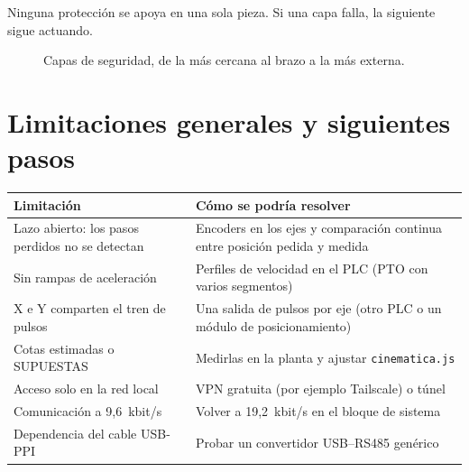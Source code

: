 \documentclass[a4paper,11pt]{article}
\newcommand{\codigo}[1]{\texttt{#1}}
\begin{document}
Ninguna protección se apoya en una sola pieza. Si una capa falla, la siguiente sigue actuando.

\begin{figure}[H]
\centering
{}
\caption{Capas de seguridad, de la más cercana al brazo a la más externa.}
\end{figure}

\section{Limitaciones generales y siguientes pasos}

\begin{center}\small
\begin{tabularx}{\linewidth}{>{\raggedright}p{5.2cm} >{\raggedright\arraybackslash}X}
\toprule
\textbf{Limitación} & \textbf{Cómo se podría resolver}\\
\midrule
Lazo abierto: los pasos perdidos no se detectan & Encoders en los ejes y comparación continua entre posición pedida y medida\\
Sin rampas de aceleración & Perfiles de velocidad en el PLC (PTO con varios segmentos)\\
X e Y comparten el tren de pulsos & Una salida de pulsos por eje (otro PLC o un módulo de posicionamiento)\\
Cotas estimadas o SUPUESTAS & Medirlas en la planta y ajustar \codigo{cinematica.js}\\
Acceso solo en la red local & VPN gratuita (por ejemplo Tailscale) o túnel\\
Comunicación a 9,6~kbit/s & Volver a 19,2~kbit/s en el bloque de sistema\\
Dependencia del cable USB-PPI & Probar un convertidor USB--RS485 genérico\\
\bottomrule
\end{tabularx}
\end{center}
\end{document}
